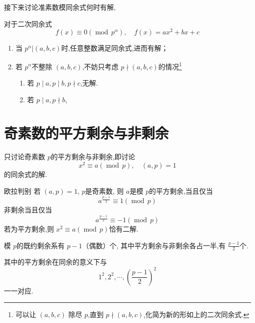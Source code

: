 \documentclass[lang=cn,12pt,color=green,fontset=none]{elegantbook}
\begin{document}
接下来讨论准素数模同余式何时有解,

\begin{theorem}
    对于二次同余式 \[
    f\left( x \right) \equiv 0\left( \operatorname{mod}\,p^{ \alpha } \right),\quad f\left( x \right)= ax^{2}+ bx+ c   
    \]

    \begin{enumerate}
        \item 当 \(  p^{\alpha } | \left( a,b,c \right)   \)时,任意整数满足同余式,进而有解；
        \item 若 \(  p^{\alpha }  \)不整除 \(  \left( a,b,c \right)   \),不妨只考虑 \(  p\nmid(a,b,c)  \)的情况\footnote{可以让 \(  \left( a,b,c \right)   \)  除尽 \(  p  \),直到 \(  p \nmid \left( a,b,c \right)   \),化简为新的形如上的二次同余式.}   
        \begin{enumerate}
            \item 若 \(  p\mid a,p\mid b, p \nmid c  \),无解.
            \item  若 \(  p\mid a, p\nmid b  \),  
        \end{enumerate}
        
    \end{enumerate}
    
\end{theorem}

\section{奇素数的平方剩余与非剩余}
只讨论奇素数 \(  p  \)的平方剩余与非剩余,即讨论 \[
x^{2}\equiv a \left( \operatorname{mod}\,p \right),\quad \left( a,p \right)= 1  
\]的同余式的解.  
\begin{theorem}{欧拉判别}
    若 \(  \left( a,p \right)   = 1\), \(  p  \)是奇素数, 则 \(  a  \)是模 \(  p  \)的平方剩余,当且仅当 \[
    a^{\frac{p-1 }{2 } }\equiv 1\left( \operatorname{mod}\,p \right) 
    \]非剩余当且仅当 \[
    a^{\frac{p-1 }{2 } }\equiv -1\left( \operatorname{mod}\,p \right) 
    \]    若为平方剩余,则 \(  x^{2}\equiv a\left( \operatorname{mod}\,p \right)   \)恰有二解. 
\end{theorem}

\begin{theorem}
    模 \(  p  \)的既约剩余系有 \(  p-1  \)（偶数）个,  其中平方剩余与非剩余各占一半,有 \(  \frac{p-1 }{ 2}   \)个.
    
    其中的平方剩余在同余的意义下与 \[
    1^{2},2^{2},\cdots , \left( \frac{p-1 }{2 }  \right)^{2} 
    \]一一对应.
\end{theorem}
\end{document}

